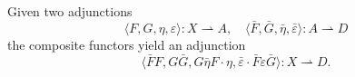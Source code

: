 Given two adjunctions
$$\langle F, G, \eta, \varepsilon \rangle : X \rightharpoonup A, \quad \langle \bar{F}, \bar{G}, \bar{\eta}, \bar{\varepsilon} \rangle : A \rightharpoonup D$$
the composite functors yield an adjunction
$$\langle \bar{F}F, G\bar{G}, G\bar{\eta}F \cdot \eta, \bar{\varepsilon} \cdot \bar{F}\varepsilon\bar{G} \rangle : X \rightharpoonup D.$$
